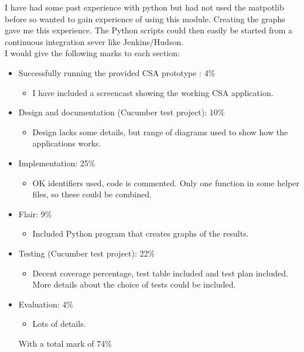 \documentclass[10pt,a4paper,titlepage]{article}
\begin{document}
I have had some past experience with python but had not used the matpotlib before so wanted to gain experience of using this module. Creating the graphs gave me this experience. The Python scripts could then easily be started from a continuous integration sever like Jenkins/Hudson.\\

I would give the following marks to each section:
\begin{itemize}
\item Successfully running the provided CSA prototype : 4\%
	\begin{itemize}
	\item I have included a screencast showing the working CSA application. 
	\end{itemize}
\item Design and documentation (Cucumber test project): 10\%
	\begin{itemize}
	\item Design lacks some details, but range of diagrams used to show how the applications works.
	\end{itemize}
\item Implementation: 25\%
	\begin{itemize}
	\item OK identifiers used, code is commented. Only one function in some helper files, so these could be combined.
	\end{itemize}
\item Flair: 9\%
	\begin{itemize}
	\item Included Python program that creates graphs of the results.
	\end{itemize}
\item Testing (Cucumber test project): 22\%
	\begin{itemize}
	\item Decent coverage percentage, test table included and test plan included. More details about the choice of tests could be included.
	\end{itemize}
\item Evaluation: 4\%
	\begin{itemize}
	\item Lots of details.
	\end{itemize}
With a total mark of 74\%

\end{itemize}
\end{document}
